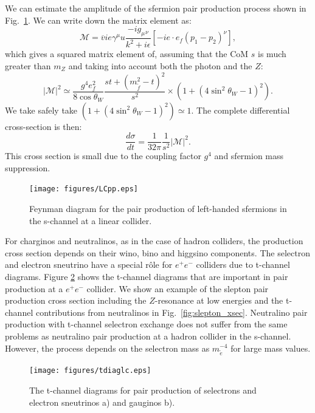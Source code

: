 \documentclass[notes.tex]{subfiles}
\begin{document}
We can estimate the amplitude of the sfermion pair production process shown in Fig.~\ref{LCPP}. We can write down the matrix element as:
\begin{equation}
\mathcal{M} = \overline{v}ie\gamma^\mu u \frac{-ig_\mu{}_\nu}{k^2+i\epsilon}[-ie\cdot e_f (p_1-p_2)^\nu],
\end{equation}
which gives a squared matrix element of, assuming that the CoM  $s$ is much greater than $m_Z$ and taking into account both the photon and the $Z$:
\begin{equation}
|\mathcal{M}|^2 \simeq \frac{g^4 e_f^2}{8\cos\theta_W}\frac{st+(m_{\tilde{f}}^2-t)^2}{s^2}\times (1+(4\sin^2\theta_W-1)^2).
\end{equation}
We take safely take $(1+(4\sin^2\theta_W-1)^2)\simeq1$. The complete differential cross-section is then:
\begin{equation}
\frac{d\sigma}{dt} = \frac{1}{32\pi}\frac{1}{s^2}|\mathcal{M}|^2.
\label{eq:sfermion_production_diff_xsec}
\end{equation}
This cross section is small due to the coupling factor $g^4$ and sfermion mass suppression. 
\begin{figure}[h!]
\begin{center}
\texttt{[image: figures/LCpp.eps]} 
\caption{Feynman diagram for the pair production of left-handed sfermions in the s-channel at a linear collider.\label{LCPP}}
\end{center}
\end{figure}

For charginos and neutralinos, as in the case of hadron colliders, the production cross section depends on their wino, bino and higgsino components. The selectron and electron sneutrino have a special r\^ole for $e^+e^-$ colliders due to t-channel diagrams. Figure \ref{fig:tdiag} shows the t-channel diagrams that are important in pair production at a $e^+e^-$ collider.  We show an example of the slepton pair production cross section including the $Z$-resonance at low energies and the t-channel contributions from neutralinos in Fig.~\ref{fig:slepton_xsec}.
Neutralino pair production with t-channel selectron exchange does not suffer from the same problems as neutralino pair production at a hadron collider in the s-channel. However, the process depends on the selectron mass as $m_{\tilde e}^{-4}$ for large mass values.

\begin{figure}[h!]
\begin{center}
\texttt{[image: figures/tdiaglc.eps]} 
\caption{The t-channel diagrams for pair production of selectrons and electron sneutrinos a) and gauginos b).\label{fig:tdiag}}
\end{center}
\end{figure}
\end{document}
